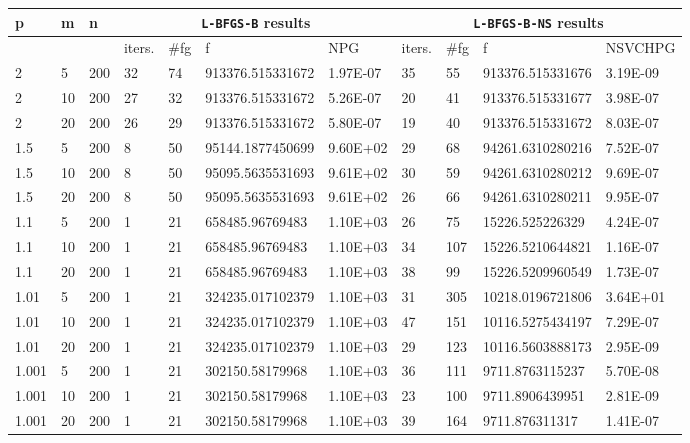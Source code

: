 \begin{table}
  \tiny
  \begin{center}
    \begin{tabular}{|l|l|l|l|l|l|l|l|l|l|l|}
      \hline
      p & m & n  & \multicolumn{4}{|c|}{\texttt{L-BFGS-B} results} & \multicolumn{4}{|c|}{\texttt{L-BFGS-B-NS} results} \\ \hline
      &  & & iters. & \#fg & f & NPG & iters. & \#fg & f & NSVCHPG \\ \hline
      2 & 5 & 200 & 32 & 74 & 913376.515331672 & 1.97E-07 & 35 & 55 & 913376.515331676 & 3.19E-09\\
      2 & 10 &  200 & 27 & 32 & 913376.515331672 & 5.26E-07 & 20 & 41 & 913376.515331677 & 3.98E-07\\
      2 & 20 &  200 & 26 & 29 & 913376.515331672 & 5.80E-07 & 19 & 40 & 913376.515331672 & 8.03E-07\\
      1.5 & 5 & 200 &  8 & 50 & 95144.1877450699 & 9.60E+02 & 29 & 68 & 94261.6310280216 & 7.52E-07\\
      1.5 & 10 & 200 &  8 & 50 & 95095.5635531693 & 9.61E+02 & 30 & 59 & 94261.6310280212 & 9.69E-07\\
      1.5 & 20 & 200 &   8 & 50 & 95095.5635531693 & 9.61E+02 & 26 & 66 & 94261.6310280211 & 9.95E-07\\
      1.1 & 5 & 200 &  1 & 21 & 658485.96769483 & 1.10E+03 & 26 & 75 & 15226.525226329 & 4.24E-07\\
      1.1 & 10 & 200 &  1 & 21 & 658485.96769483 & 1.10E+03 & 34 & 107 & 15226.5210644821 & 1.16E-07\\
      1.1 & 20 & 200 &  1 & 21 & 658485.96769483 & 1.10E+03 & 38 & 99 & 15226.5209960549 & 1.73E-07\\
      1.01 & 5 & 200 &  1 & 21 & 324235.017102379 & 1.10E+03 & 31 & 305 & 10218.0196721806 & 3.64E+01\\
      1.01 & 10 & 200 &  1 & 21 & 324235.017102379 & 1.10E+03 & 47 & 151 & 10116.5275434197 & 7.29E-07\\
      1.01 & 20 & 200 &  1 & 21 & 324235.017102379 & 1.10E+03 & 29 & 123 & 10116.5603888173 & 2.95E-09\\
      1.001 & 5 & 200 &  1 & 21 & 302150.58179968 & 1.10E+03 & 36 & 111 & 9711.8763115237 & 5.70E-08\\
      1.001 & 10 & 200 &  1 & 21 & 302150.58179968 & 1.10E+03 & 23 & 100 & 9711.8906439951 & 2.81E-09\\
      1.001 & 20 & 200 &  1 & 21 & 302150.58179968 & 1.10E+03 & 39 & 164 & 9711.876311317 & 1.41E-07\\

\end{tabular}
\end{center}
\end{table}
